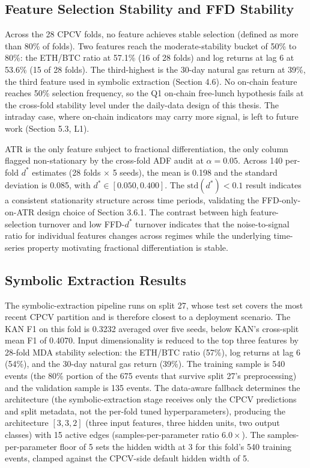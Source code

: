 \subsection{Feature Selection Stability and FFD Stability}\label{subsec:results_features}

Across the 28 CPCV folds, no feature achieves stable selection (defined as more than 80\% of folds). Two features reach the moderate-stability bucket of 50\% to 80\%: the ETH/BTC ratio at 57.1\% (16 of 28 folds) and log returns at lag 6 at 53.6\% (15 of 28 folds). The third-highest is the 30-day natural gas return at 39\%, the third feature used in symbolic extraction (Section 4.6). No on-chain feature reaches 50\% selection frequency, so the Q1 on-chain free-lunch hypothesis fails at the cross-fold stability level under the daily-data design of this thesis. The intraday case, where on-chain indicators may carry more signal, is left to future work (Section 5.3, L1).

ATR is the only feature subject to fractional differentiation, the only column flagged non-stationary by the cross-fold ADF audit at $\alpha = 0.05$. Across 140 per-fold $d^{\ast}$ estimates (28 folds $\times$ 5 seeds), the mean is 0.198 and the standard deviation is 0.085, with $d^{\ast} \in [0.050, 0.400]$. The $\text{std}(d^{\ast}) < 0.1$ result indicates a consistent stationarity structure across time periods, validating the FFD-only-on-ATR design choice of Section 3.6.1. The contrast between high feature-selection turnover and low FFD-$d^{\ast}$ turnover indicates that the noise-to-signal ratio for individual features changes across regimes while the underlying time-series property motivating fractional differentiation is stable.


\subsection{Symbolic Extraction Results}\label{subsec:results_symbolic}

The symbolic-extraction pipeline runs on split 27, whose test set covers the most recent CPCV partition and is therefore closest to a deployment scenario. The KAN F1 on this fold is 0.3232 averaged over five seeds, below KAN's cross-split mean F1 of 0.4070. Input dimensionality is reduced to the top three features by 28-fold MDA stability selection: the ETH/BTC ratio (57\%), log returns at lag 6 (54\%), and the 30-day natural gas return (39\%). The training sample is 540 events (the 80\% portion of the 675 events that survive split 27's preprocessing) and the validation sample is 135 events. The data-aware fallback determines the architecture (the symbolic-extraction stage receives only the CPCV predictions and split metadata, not the per-fold tuned hyperparameters), producing the architecture $[3, 3, 2]$ (three input features, three hidden units, two output classes) with 15 active edges (samples-per-parameter ratio $6.0\times$). The samples-per-parameter floor of 5 sets the hidden width at 3 for this fold's 540 training events, clamped against the CPCV-side default hidden width of 5.

